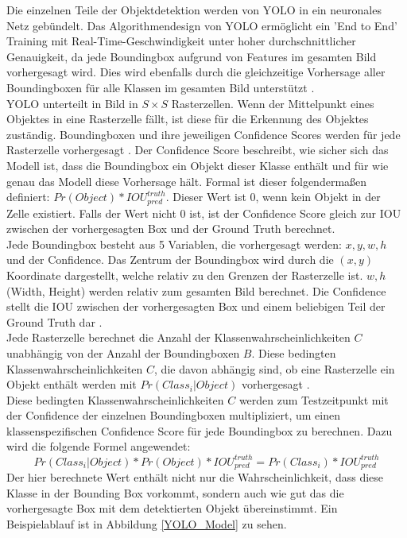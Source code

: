 {{	Die einzelnen Teile der Objektdetektion werden von YOLO in ein neuronales Netz gebündelt. Das Algorithmendesign von YOLO ermöglicht ein 'End to End' Training mit Real-Time-Geschwindigkeit unter hoher durchschnittlicher Genauigkeit, da jede Boundingbox aufgrund von Features im gesamten Bild vorhergesagt wird. Dies wird ebenfalls durch die gleichzeitige Vorhersage aller Boundingboxen für alle Klassen im gesamten Bild unterstützt \citep{Plastiras2018}. \\
	YOLO unterteilt in Bild in $S \times S $ Rasterzellen. Wenn der Mittelpunkt eines Objektes in eine Rasterzelle fällt, ist diese für die Erkennung des Objektes zuständig. Boundingboxen und ihre jeweiligen Confidence Scores werden für jede Rasterzelle vorhergesagt \citep{Plastiras2018}.
	Der Confidence Score beschreibt, wie sicher sich das Modell ist, dass die Boundingbox ein Objekt dieser Klasse enthält und für wie genau das Modell diese Vorhersage hält. Formal ist dieser folgendermaßen definiert:  $Pr (Object) * IOU^{truth}_{pred}$. Dieser Wert ist 0, wenn kein Objekt in der Zelle existiert. Falls der Wert nicht 0 ist, ist der Confidence Score gleich zur IOU zwischen der vorhergesagten Box und der Ground Truth berechnet. \\
	Jede Boundingbox besteht aus 5 Variablen, die vorhergesagt werden: $x, y, w, h$ und der Confidence. Das Zentrum der Boundingbox wird durch die $(x, y)$ Koordinate dargestellt, welche relativ zu den Grenzen der Rasterzelle ist. $w, h$ (Width, Height) werden relativ zum gesamten Bild berechnet. Die Confidence stellt die IOU zwischen der vorhergesagten Box und einem beliebigen Teil der Ground Truth dar \citep{Plastiras2018}. \\
	Jede Rasterzelle berechnet die Anzahl der Klassenwahrscheinlichkeiten $C$ unabhängig von der Anzahl der Boundingboxen $B$. Diese bedingten Klassenwahrscheinlichkeiten $C$, die davon abhängig sind, ob eine Rasterzelle ein Objekt enthält werden mit $Pr(Class_i | Object)$ vorhergesagt \citep{Plastiras2018}. \\
	Diese bedingten Klassenwahrscheinlichkeiten $C$ werden zum Testzeitpunkt mit der Confidence der einzelnen Boundingboxen multipliziert, um einen klassenspezifischen Confidence Score für jede Boundingbox zu berechnen. Dazu wird die folgende Formel angewendet: 
	\begin{equation}
	Pr(Class_i|Object) * Pr(Object) * IOU_{pred}^{truth} = Pr(Class_i) * IOU_{pred}^{truth}
	\end{equation}
	Der hier berechnete Wert enthält nicht nur die Wahrscheinlichkeit, dass diese Klasse in der Bounding Box vorkommt, sondern auch wie gut das die vorhergesagte Box mit dem detektierten Objekt übereinstimmt. Ein Beispielablauf ist in Abbildung \ref{YOLO_Model} zu sehen.
}}
